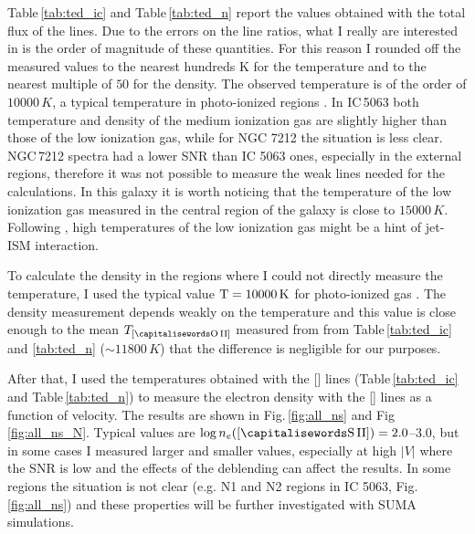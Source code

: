\documentclass[../thesis.tex]{subfiles}
\begin{document}
Table\,\ref{tab:ted_ic} and Table\,\ref{tab:ted_n} report the values obtained with the total flux of the lines.
Due to the errors on the line ratios, what I really are interested in is the order of magnitude of these quantities.
For this reason I rounded off the measured values to the nearest hundreds K for the temperature and to the nearest multiple of $50$ for the density.
The observed temperature is of the order of $10000\,\si{K}$, a typical temperature in photo-ionized regions \citep{OsterbrockAGN}.
In IC\,5063 both temperature and density of the medium ionization gas are slightly higher than those of the low ionization gas, while for NGC 7212 the situation is less clear.
NGC\,7212 spectra had a lower SNR than IC 5063 ones, especially in the external regions, therefore it was not possible to measure the weak lines needed for the calculations.
In this galaxy it is worth noticing that the temperature of the low ionization gas measured in the central region of the galaxy is close to $15000\,\si{K}$. 
Following \citet{Roche16}, high temperatures of the low ionization gas might be a hint of jet-ISM interaction.

To calculate the density in the regions where I could not directly measure the temperature, I used the typical value $\rm{T} = 10000\,\si{K}$ for photo-ionized gas \citep{OsterbrockAGN}. 
The density measurement depends weakly on the temperature \citep{OsterbrockAGN} and this value is close enough to the mean $T_{[\rm \ion{O}{II}]}$ measured from from Table\,\ref{tab:ted_ic} and \ref{tab:ted_n} ($\sim 11800\,\si{K}$) that the difference is negligible for our purposes.

After that, I used the temperatures obtained with the [] lines (Table\,\ref{tab:ted_ic} and Table\,\ref{tab:ted_n}) to measure the electron density with the [] lines as a function of velocity.
The results are shown in Fig.\,\ref{fig:all_ns} and Fig\,\ref{fig:all_ns_N}.
Typical values are $\log n_e([\rm\ion{S}{II}]) = 2.0$--$3.0$, but in some cases I measured larger and smaller values, especially at high $\lvert V \rvert$ where the SNR is low and the effects of the deblending can affect the results.
In some regions the situation is not clear (e.g. N1 and N2 regions in IC 5063, Fig.\,\ref{fig:all_ns}) and these properties will be further investigated with SUMA simulations.
\end{document}
